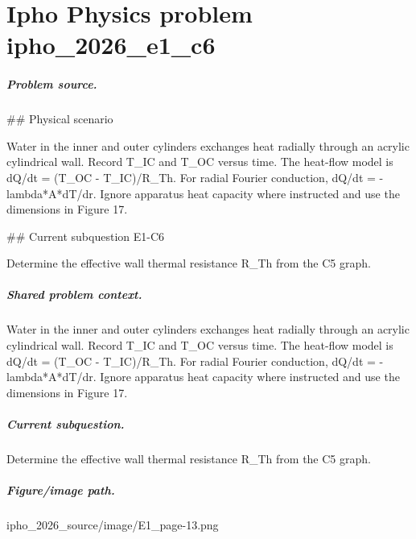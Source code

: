 
\chapter{Ipho Physics problem ipho\_2026\_e1\_c6}
\label{ch:IPhO2026Problems_problem_ipho_2026_e1_c6}

\paragraph{Problem source.}
\#\# Physical scenario

Water in the inner and outer cylinders exchanges heat radially through an
acrylic cylindrical wall.  Record T\_IC and T\_OC versus time.  The heat-flow
model is dQ/dt = (T\_OC - T\_IC)/R\_Th.  For radial Fourier conduction,
dQ/dt = -lambda*A*dT/dr.  Ignore apparatus heat capacity where instructed and
use the dimensions in Figure 17.

\#\# Current subquestion E1-C6

Determine the effective wall thermal resistance R\_Th from the C5 graph.

\paragraph{Shared problem context.}
Water in the inner and outer cylinders exchanges heat radially through an
acrylic cylindrical wall.  Record T\_IC and T\_OC versus time.  The heat-flow
model is dQ/dt = (T\_OC - T\_IC)/R\_Th.  For radial Fourier conduction,
dQ/dt = -lambda*A*dT/dr.  Ignore apparatus heat capacity where instructed and
use the dimensions in Figure 17.

\paragraph{Current subquestion.}
Determine the effective wall thermal resistance R\_Th from the C5 graph.

\paragraph{Figure/image path.}
ipho\_2026\_source/image/E1\_page-13.png

